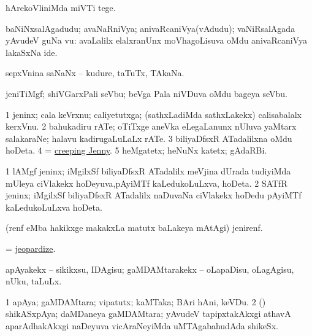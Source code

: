 \bentry
{}
\gl{\sakirx}
\bmng
hArekoVliniMda miVTi tege. 
\emng
\eentry

\bentry
{}
\gl{\nA}
\expl{\F}
\bmng
baNiNxsalAgadudu; avaNaRniVya; anivaRcaniVya(vAdudu); vaNiRsalAgada yAvudeV guNa \mo vu:    avaLalilx elalxranUnx moVhagoLisuva oMdu anivaRcaniVya lakaSxNa ide. 
\emng
\eentry

\bentry
{}
\gl{\nA}
\bmng
sepxVnina saNaNx -- kudure, taTuTx, TAkaNa. 
\emng
\eentry

\bentry
{}
\gl{\nA}
\bmng
jeniTiMgf; shiVGarxPali seVbu; beVga Pala niVDuva oMdu bageya seVbu. 
\emng
\eentry

\bentry
{}
\gl{\nA}
\bmng
\bnum
\num{1} jeninx; cala keVrxnu; caliyetutxga; (sathxLadiMda sathxLakekx) calisabalalx kerxVnu. 
\num{2} bahukadiru rATe; oTiTxge aneVka eLegaLanunx nUluva yaMtarx salakaraNe; halavu kadirugaLuLaLx rATe. 
\num{3} biliyaDfsxR ATadalilxna oMdu hoDeta. 
\num{4} = \hyperref{kandict_c.pdf}{C}{creeping Jenny}{creeping Jenny}. 
\num{5} heMgatetx; heNuNx katetx; gAdaRBi. 
\enum
\emng

\noindent
\gl{\pagu}
\bmng
\bnum
\num{1}  lAMgf jeninx; iMgilxSf biliyaDfsxR ATadalilx meVjina dUrada tudiyiMda mUleya ciVlakekx hoDeyuva,pAyiMTf kaLedukoLuLxva, hoDeta. 
\num{2}  SATfR jeninx; iMgilxSf biliyaDfsxR ATadalilx naDuvaNa ciVlakekx hoDedu pAyiMTf kaLedukoLuLxva hoDeta. 
\enum
\emng
\eentry

\bentry
{}
\gl{\nA}
\bmng
(renf eMba hakikxge makakxLa matutx baLakeya mAtAgi) jenirenf. 
\emng
\eentry

\bentry
{}
\gl{\sakirx}
\bmng
= \hyperlink{jeopardize}{jeopardize}. 
\emng
\eentry

\bentry
{}
\gl{\sakirx}
\bmng
apAyakekx -- sikikxsu, IDAgisu; gaMDAMtarakekx -- oLapaDisu, oLagAgisu, nUku, taLuLx. 
\emng
\eentry

\bentry
{}
\gl{\nA}
\bmng
\bnum
\num{1} apAya; gaMDAMtara; vipatutx; kaMTaka; BAri hAni, keVDu. 
\num{2} (\nAyxshA) shikASxpAya; daMDaneya gaMDAMtara; yAvudeV tapipxtakAkxgi athavA aparAdhakAkxgi naDeyuva vicAraNeyiMda uMTAgabahudAda shikeSx. 
\enum
\emng
\eentry

